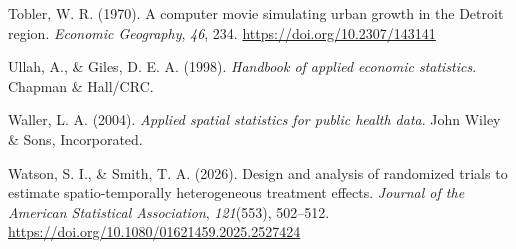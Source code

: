\documentclass[
  12pt,
  prelim]{bios-prelim}
\newlength{\cslhangindent}
\newenvironment{CSLReferences}[2] %
 {\begin{list}{}{%
  \setlength{\itemindent}{0pt}
  \setlength{\leftmargin}{0pt}
  \setlength{\parsep}{0pt}
  \ifodd #1
   \setlength{\leftmargin}{\cslhangindent}
   \setlength{\itemindent}{-1\cslhangindent}
  \fi
  \setlength{\itemsep}{#2\baselineskip}}}
 {\end{list}}
\begin{document}
\begin{CSLReferences}{1}{0}
Tobler, W. R. (1970). A computer movie simulating urban growth in the
{Detroit} region. \emph{Economic Geography}, \emph{46}, 234.
\url{https://doi.org/10.2307/143141}

Ullah, A., \& Giles, D. E. A. (1998). \emph{Handbook of applied economic
statistics}. Chapman \& Hall/CRC.

Waller, L. A. (2004). \emph{Applied spatial statistics for public health
data}. John Wiley \& Sons, Incorporated.

Watson, S. I., \& Smith, T. A. (2026). Design and analysis of randomized
trials to estimate spatio-temporally heterogeneous treatment effects.
\emph{Journal of the American Statistical Association}, \emph{121}(553),
502--512. \url{https://doi.org/10.1080/01621459.2025.2527424}

\end{CSLReferences}
\end{document}

